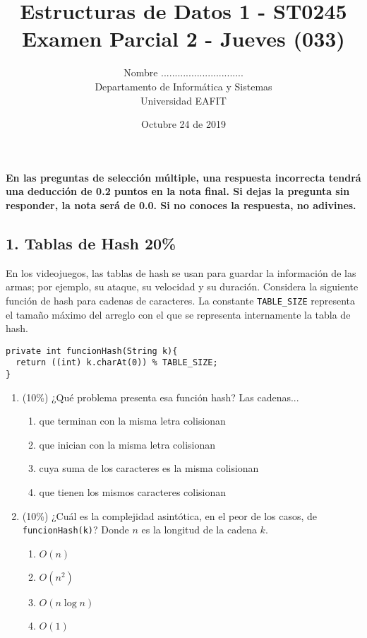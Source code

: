 \documentclass[10 pt]{article}
\title{\textbf {Estructuras de Datos 1 - ST0245\\Examen Parcial 2 - Jueves (033)
}}
\author{Nombre ..............................\\
		Departamento de Informática y Sistemas\\
		Universidad EAFIT\\}
\date{Octubre 24 de 2019}
\begin{document}
\lstset{escapechar=@,style=customc, numbers=left, stepnumber = 1} 
\maketitle

\textbf{En las preguntas de selección múltiple, una respuesta incorrecta tendrá
una deducción de 0.2 puntos en la nota final. Si dejas la pregunta sin
responder, la nota será de 0.0. Si no conoces la respuesta, no adivines.}


\begin{multicols}{2}
\section{1. Tablas de Hash 20\%}
En los videojuegos, las tablas de hash se usan para guardar la información de las armas; por ejemplo,
su ataque, su velocidad y su duración. Considera la siguiente función de hash para cadenas de caracteres.
La constante \texttt{TABLE\_SIZE} representa el tamaño máximo del arreglo con el que se representa 
internamente la tabla de hash.

{\footnotesize
\begin{lstlisting}
private int funcionHash(String k){
  return ((int) k.charAt(0)) % TABLE_SIZE;
}
\end{lstlisting}
}
\begin{enumerate}[label=\alph*]
	\item (10\%) ¿Qué problema presenta esa función hash? Las cadenas...
	{\small
	\begin{enumerate}[label=\roman*]
		\item  que terminan con la misma letra colisionan
		\item  que inician con la misma letra colisionan
		\item  cuya suma de los caracteres es la misma colisionan
		\item  que tienen los mismos caracteres colisionan
	\end{enumerate}
	}
	\item (10\%) ¿Cuál es la complejidad asintótica, en el peor de los casos, de \texttt{funcionHash(k)}? Donde $n$ es la longitud de la cadena $k$.
	\begin{enumerate}[label=\roman*]
		\item $O(n)$
		\item $O(n^2)$
		\item $O(n\log n)$
		\item $O(1)$
	\end{enumerate}
\end{enumerate}



\end{multicols}
\end{document}
